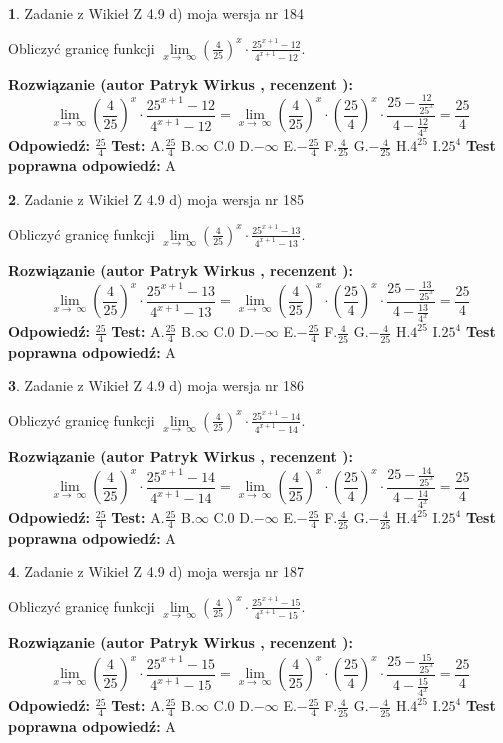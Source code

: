 \documentclass[12pt, a4paper]{article}
\theoremstyle{definition} %
\newtheorem{zad}{}
\newcommand{\zadStart}[1]{\begin{zad}#1\newline}
\newcommand{\zadStop}{\end{zad}}
\newcommand{\rozwStart}[2]{\noindent \textbf{Rozwiązanie (autor #1 , recenzent #2): }\newline}
\newcommand{\rozwStop}{\newline}
\newcommand{\odpStart}{\noindent \textbf{Odpowiedź:}\newline}
\newcommand{\odpStop}{\newline}
\newcommand{\testStart}{\noindent \textbf{Test:}\newline}
\newcommand{\testStop}{\newline}
\newcommand{\kluczStart}{\noindent \textbf{Test poprawna odpowiedź:}\newline}
\newcommand{\kluczStop}{\newline}
\begin{document}
\zadStart{Zadanie z Wikieł Z 4.9 d) moja wersja nr 184}


Obliczyć granicę funkcji  $\lim\limits_{x\to\ \infty}(\frac{4}{25})^{x}\cdot\frac{25^{x+1}-12}{4^{x+1}-12}$.
\zadStop
\rozwStart{Patryk Wirkus}{}
$$\lim\limits_{x\to\ \infty}(\frac{4}{25})^{x}\cdot\frac{25^{x+1}-12}{4^{x+1}-12}=\lim\limits_{x\to\ \infty}(\frac{4}{25})^{x}\cdot(\frac{25}{4})^{x} \cdot \frac{25-\frac{12}{25^{x}}}{4-\frac{12}{4^{x}}} = \frac{25}{4}$$
\rozwStop
\odpStart
$\frac{25}{4}$
\odpStop
\testStart
A.$\frac{25}{4}$ B.$\infty$ C.$0$ D.$-\infty$ E.$-\frac{25}{4}$
F.$\frac{4}{25}$ G.$-\frac{4}{25}$
H.$4^{25}$
I.$25^{4}$
\testStop
\kluczStart
A
\kluczStop



\zadStart{Zadanie z Wikieł Z 4.9 d) moja wersja nr 185}


Obliczyć granicę funkcji  $\lim\limits_{x\to\ \infty}(\frac{4}{25})^{x}\cdot\frac{25^{x+1}-13}{4^{x+1}-13}$.
\zadStop
\rozwStart{Patryk Wirkus}{}
$$\lim\limits_{x\to\ \infty}(\frac{4}{25})^{x}\cdot\frac{25^{x+1}-13}{4^{x+1}-13}=\lim\limits_{x\to\ \infty}(\frac{4}{25})^{x}\cdot(\frac{25}{4})^{x} \cdot \frac{25-\frac{13}{25^{x}}}{4-\frac{13}{4^{x}}} = \frac{25}{4}$$
\rozwStop
\odpStart
$\frac{25}{4}$
\odpStop
\testStart
A.$\frac{25}{4}$ B.$\infty$ C.$0$ D.$-\infty$ E.$-\frac{25}{4}$
F.$\frac{4}{25}$ G.$-\frac{4}{25}$
H.$4^{25}$
I.$25^{4}$
\testStop
\kluczStart
A
\kluczStop



\zadStart{Zadanie z Wikieł Z 4.9 d) moja wersja nr 186}


Obliczyć granicę funkcji  $\lim\limits_{x\to\ \infty}(\frac{4}{25})^{x}\cdot\frac{25^{x+1}-14}{4^{x+1}-14}$.
\zadStop
\rozwStart{Patryk Wirkus}{}
$$\lim\limits_{x\to\ \infty}(\frac{4}{25})^{x}\cdot\frac{25^{x+1}-14}{4^{x+1}-14}=\lim\limits_{x\to\ \infty}(\frac{4}{25})^{x}\cdot(\frac{25}{4})^{x} \cdot \frac{25-\frac{14}{25^{x}}}{4-\frac{14}{4^{x}}} = \frac{25}{4}$$
\rozwStop
\odpStart
$\frac{25}{4}$
\odpStop
\testStart
A.$\frac{25}{4}$ B.$\infty$ C.$0$ D.$-\infty$ E.$-\frac{25}{4}$
F.$\frac{4}{25}$ G.$-\frac{4}{25}$
H.$4^{25}$
I.$25^{4}$
\testStop
\kluczStart
A
\kluczStop



\zadStart{Zadanie z Wikieł Z 4.9 d) moja wersja nr 187}


Obliczyć granicę funkcji  $\lim\limits_{x\to\ \infty}(\frac{4}{25})^{x}\cdot\frac{25^{x+1}-15}{4^{x+1}-15}$.
\zadStop
\rozwStart{Patryk Wirkus}{}
$$\lim\limits_{x\to\ \infty}(\frac{4}{25})^{x}\cdot\frac{25^{x+1}-15}{4^{x+1}-15}=\lim\limits_{x\to\ \infty}(\frac{4}{25})^{x}\cdot(\frac{25}{4})^{x} \cdot \frac{25-\frac{15}{25^{x}}}{4-\frac{15}{4^{x}}} = \frac{25}{4}$$
\rozwStop
\odpStart
$\frac{25}{4}$
\odpStop
\testStart
A.$\frac{25}{4}$ B.$\infty$ C.$0$ D.$-\infty$ E.$-\frac{25}{4}$
F.$\frac{4}{25}$ G.$-\frac{4}{25}$
H.$4^{25}$
I.$25^{4}$
\testStop
\kluczStart
A
\kluczStop
\end{document}
